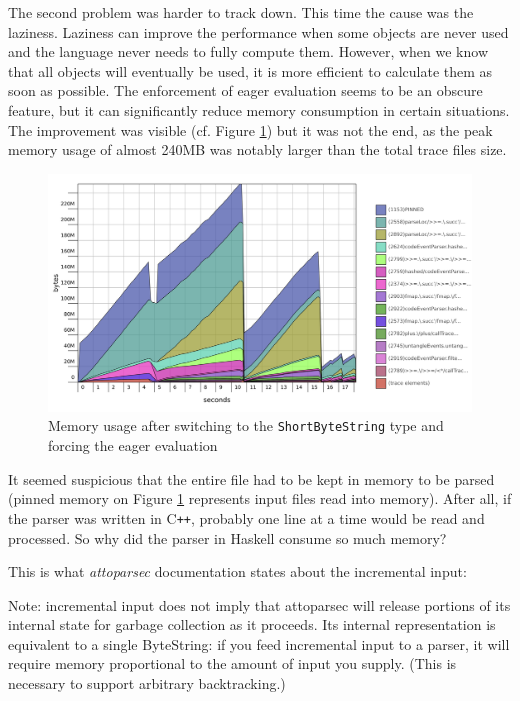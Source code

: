 The second problem was harder to track down. This time the cause was the laziness.
Laziness can improve the performance when some objects are never used and the language never needs to fully compute them. 
However, when we know that all objects will eventually be used, it is more efficient
to calculate them as soon as possible. The enforcement of eager evaluation seems to be an obscure
feature, but it can significantly reduce memory consumption in certain situations.
The improvement was visible (cf. Figure \ref{fig:shortbytestring-strict}) but it was not the end, 
as the peak memory usage of almost 240MB was notably larger than the total trace files size.

\begin{figure}[hbt!]
 \centering
 \includegraphics[width=\textwidth]{png/shortbytestring-strict}
 \caption{Memory usage after switching to the \texttt{ShortByteString} type and forcing the eager evaluation}
 \label{fig:shortbytestring-strict}
\end{figure}

It seemed suspicious that the entire file had to be kept in memory to be parsed 
(pinned memory on Figure \ref{fig:shortbytestring-strict} represents input files read into memory). 
After all, if the parser was written in C\texttt{++}, probably one line at a time would be read and processed. 
So why did the parser in Haskell consume so much memory?

This is what \emph{attoparsec} documentation states about the incremental input:

\begin{displayquote}
Note: incremental input does not imply that attoparsec will release portions of its internal state for 
garbage collection as it proceeds. Its internal representation is equivalent to a single ByteString: 
if you feed incremental input to a parser, it will require memory proportional to the amount of input you supply. 
(This is necessary to support arbitrary backtracking.)
\end{displayquote}

